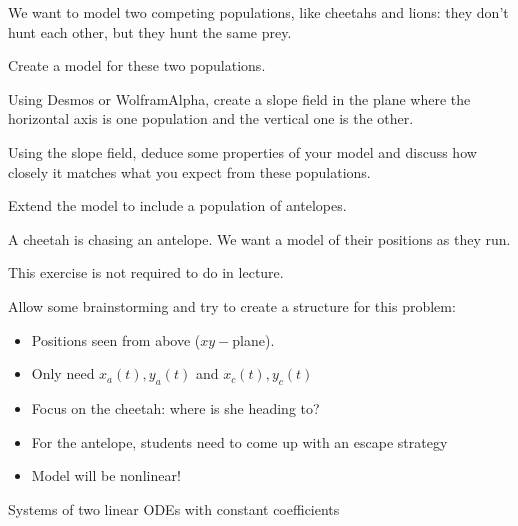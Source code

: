 \question We want to model two competing populations, like cheetahs and lions: they don't hunt each other, but they hunt the same prey.
\begin{parts}
	\item Create a model for these two populations.
	\item Using Desmos or WolframAlpha, create a slope field in the plane where the horizontal axis is one population and the vertical one is the other.
	\item Using the slope field, deduce some properties of your model and discuss how closely it matches what you expect from these populations.

	\item Extend the model to include a population of antelopes.	
\end{parts}





\bookonlynewpage


\question
	A cheetah is chasing an antelope. We want a model of their positions as they run.
	
	
\begin{annotation}
	\begin{goals}
		This exercise is not required to do in lecture.
		
		Allow some brainstorming and try to create a structure for this problem:
		\begin{itemize}
			\item Positions seen from above ($xy-$plane).
			\item Only need $x_a(t), y_a(t)$ and $x_c(t), y_c(t)$
			\item Focus on the cheetah: where is she heading to?
			\item For the antelope, students need to come up with an escape strategy
			\item Model will be nonlinear!
		\end{itemize}
	\end{goals}
\end{annotation}




\standardonlynewpage

%
%



\begin{module}{Systems of two linear ODEs with constant coefficients}
	\label{sys:solve}

	
	
\end{module}



